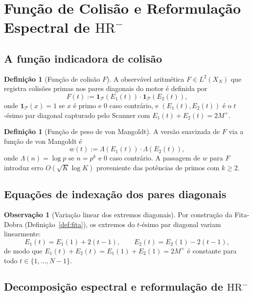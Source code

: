 \documentclass[12pt,a4paper]{article}
\theoremstyle{definition}
\newtheorem{definition}[theorem]{Definição}
\newtheorem{remark}[theorem]{Observação}
\newcommand{\PP}{\mathcal{P}}          %
\newcommand{\HRm}{\mathrm{HR}^{-}}
\begin{document}
	\section{Função de Colisão e Reformulação Espectral de
		\texorpdfstring{$\HRm$}{HR-}}
	\label{sec:colisao}
	
	\subsection{A função indicadora de colisão}
	
	\begin{definition}[Função de colisão $F$]
		\label{def:colisao}
		A observável aritmética $F \in L^2(X_N)$ que registra colisões
		primas nos pares diagonais do motor é definida por
		\[
		F(t) := \mathbf{1}_{\PP}(E_1(t))\cdot\mathbf{1}_{\PP}(E_2(t)),
		\]
		onde $\mathbf{1}_{\PP}(x) = 1$ se $x$ é primo e $0$ caso
		contrário, e $(E_1(t), E_2(t))$ é o $t$-ésimo par diagonal
		capturado pelo Scanner com $E_1(t)+E_2(t)=2M^+$.
	\end{definition}
	
	\begin{definition}[Função de peso de von Mangoldt]
		\label{def:mangoldt}
		A versão suavizada de $F$ via a função de von Mangoldt é
		\[
		w(t) := \Lambda(E_1(t))\cdot\Lambda(E_2(t)),
		\]
		onde $\Lambda(n) = \log p$ se $n = p^k$ e $0$ caso contrário.
		A passagem de $w$ para $F$ introduz erro $O(\sqrt{K}\log K)$
		proveniente das potências de primos com $k \geq 2$.
	\end{definition}
	
	\subsection{Equações de indexação dos pares diagonais}
	
	\begin{remark}[Variação linear dos extremos diagonais]
		\label{rem:movimento}
		Por construção da Fita-Dobra (Definição~\ref{def:fita}), os
		extremos do $t$-ésimo par diagonal variam linearmente:
		\[
		E_1(t) = E_1(1) + 2(t-1),\qquad
		E_2(t) = E_2(1) - 2(t-1),
		\]
		de modo que $E_1(t) + E_2(t) = E_1(1) + E_2(1) = 2M^+$ é
		constante para todo $t \in \{1,\ldots,N-1\}$.
	\end{remark}
	
	\subsection{Decomposição espectral e reformulação de
		\texorpdfstring{$\HRm$}{HR-}}
	
\end{document}
